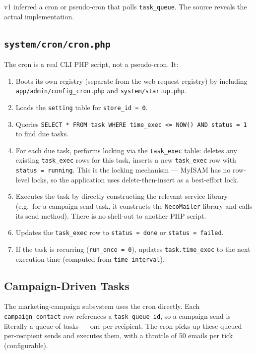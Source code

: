 \documentclass[11pt,a4paper]{article}
\begin{document}
v1 inferred a cron or pseudo-cron that polls
\texttt{task\_queue}. The source reveals the actual implementation.

\subsection{\texttt{system/cron/cron.php}}

The cron is a real CLI PHP script, not a pseudo-cron. It:

\begin{enumerate}[leftmargin=1.6em,itemsep=2pt]
  \item Boots its own registry (separate from the web request
        registry) by including \texttt{app/admin/config\_cron.php}
        and \texttt{system/startup.php}.
  \item Loads the \texttt{setting} table for \texttt{store\_id = 0}.
  \item Queries \texttt{SELECT * FROM task WHERE time\_exec <= NOW()
        AND status = 1} to find due tasks.
  \item For each due task, performs locking via the
        \texttt{task\_exec} table: deletes any existing
        \texttt{task\_exec} rows for this task, inserts a new
        \texttt{task\_exec} row with \texttt{status = running}.
        This is the locking mechanism --- MyISAM has no row-level
        locks, so the application uses delete-then-insert as a
        best-effort lock.
  \item Executes the task by directly constructing the relevant
        service library (e.g.\ for a campaign-send task, it
        constructs the \texttt{NecoMailer} library and calls its
        send method). There is no shell-out to another PHP script.
  \item Updates the \texttt{task\_exec} row to \texttt{status =
        done} or \texttt{status = failed}.
  \item If the task is recurring (\texttt{run\_once = 0}), updates
        \texttt{task.time\_exec} to the next execution time
        (computed from \texttt{time\_interval}).
\end{enumerate}

\subsection{Campaign-Driven Tasks}

The marketing-campaign subsystem uses the cron directly. Each
\texttt{campaign\_contact} row references a
\texttt{task\_queue\_id}, so a campaign send is literally a queue
of tasks --- one per recipient. The cron picks up these queued
per-recipient sends and executes them, with a throttle of 50 emails
per tick (configurable).
\end{document}
